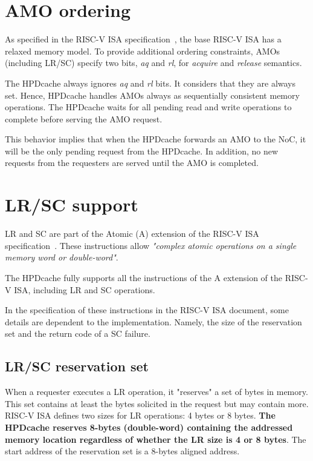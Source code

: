 \documentclass[10pt,titlepage,twoside]{book}
\begin{document}
\section{AMO ordering}

As specified in the RISC-V ISA specification~\cite{RISCV_spec}, the base RISC-V ISA has a relaxed memory model.
To provide additional ordering constraints, \acp{AMO} (including \acs*{LR}/\acs*{SC}) specify two bits, \textit{aq} and \textit{rl}, for \textit{acquire} and \textit{release} semantics.

The \ac{HPDcache} always ignores \textit{aq} and \textit{rl} bits.
It considers that they are always set.
Hence, \ac{HPDcache} handles \acp{AMO} always as sequentially consistent memory operations.
The \ac{HPDcache} waits for all pending read and write operations to complete before serving the \ac{AMO} request.

This behavior implies that when the \ac{HPDcache} forwards an \ac{AMO} to the \ac{NoC}, it will be the only pending request from the \ac{HPDcache}.
In addition, no new requests from the requesters are served until the \ac{AMO} is completed.


\section{LR/SC support}

\acf{LR} and \acf{SC} are part of the Atomic (A) extension of the RISC-V ISA specification~\cite{RISCV_spec}.
These instructions allow {\it "complex atomic operations on a single memory word or double-word"}.

The \ac{HPDcache} fully supports all the instructions of the A extension of the RISC-V ISA, including \ac{LR} and \ac{SC} operations.

In the specification of these instructions in the RISC-V ISA document, some details are dependent to the implementation.
Namely, the size of the reservation set and the return code of a \ac{SC} failure.


\subsection{LR/SC reservation set}

When a requester executes a \ac{LR} operation, it "reserves" a set of bytes in memory.
This set contains at least the bytes solicited in the request but may contain more.
RISC-V ISA defines two sizes for \ac{LR} operations: 4 bytes or 8 bytes.
{\bf The \ac{HPDcache} reserves 8-bytes (double-word) containing the addressed memory location regardless of whether the \ac{LR} size is 4 or 8 bytes}.
The start address of the reservation set is a 8-bytes aligned address.
\end{document}
